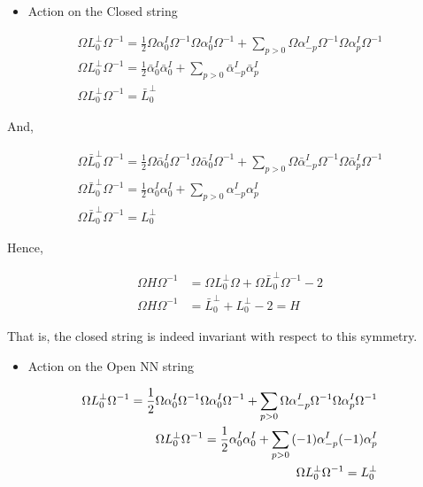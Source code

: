 \begin{itemize}
    \item Action on the Closed string
\end{itemize}
\begin{align*}
    \Omega L^\perp_0\Omega^{-1}=\frac12\Omega\alpha_0^I\Omega^{-1}\Omega\alpha_0^I\Omega^{-1}+\sum\limits_{p>0}\Omega\alpha^I_{-p}\Omega^{-1}\Omega\alpha^I_p\Omega^{-1}\\
    \Omega L^\perp_0\Omega^{-1}=\frac12{\bar\alpha}_0^I{\bar\alpha}_0^I+\sum\limits_{p>0}{\bar\alpha}^I_{-p}{\bar\alpha}^I_p\\
    \Omega L^\perp_0\Omega^{-1}={\bar L}_0^\perp
\end{align*}

And,

\begin{align*}
    \Omega {\bar L}^\perp_0\Omega^{-1}=\frac12\Omega{\bar \alpha}_0^I\Omega^{-1}\Omega{\bar \alpha}_0^I\Omega^{-1}+\sum\limits_{p>0}\Omega{\bar \alpha}^I_{-p}\Omega^{-1}\Omega{\bar \alpha}^I_p\Omega^{-1}\\
    \Omega {\bar L}^\perp_0\Omega^{-1}=\frac12{\alpha}_0^I{\alpha}_0^I+\sum\limits_{p>0}{\alpha}^I_{-p}{\alpha}^I_p\\
    \Omega {\bar L}^\perp_0\Omega^{-1}={ L}_0^\perp
\end{align*}

Hence,

\begin{align*}
    \Omega H\Omega^{-1}&=\Omega L^\perp_0\Omega+\Omega{\bar L}^\perp_0\Omega^{-1}-2\\
    \Omega H\Omega^{-1}&={\bar L}^\perp_0+ L^\perp_0-2=H
\end{align*}

That is, the closed string is indeed invariant with respect to this symmetry.

\begin{itemize}
    \item Action on the Open NN string
\end{itemize}
\begin{align*}
    \Omega L^\perp_0\Omega^{-1}=\frac12\Omega\alpha_0^I\Omega^{-1}\Omega\alpha_0^I\Omega^{-1}+\sum\limits_{p>0}\Omega\alpha^I_{-p}\Omega^{-1}\Omega\alpha^I_p\Omega^{-1}\\
    \Omega L^\perp_0\Omega^{-1}=\frac12{\alpha}_0^I{\alpha}_0^I+\sum\limits_{p>0}\qty(-1){\alpha}^I_{-p}\qty(-1){\alpha}^I_p\\
    \Omega L^\perp_0\Omega^{-1}={L}_0^\perp
\end{align*}

